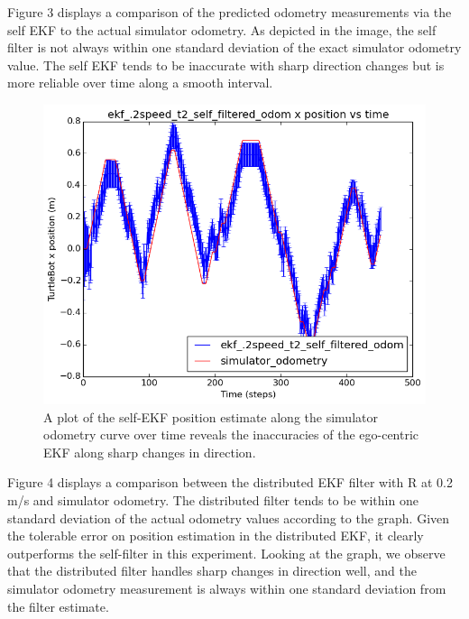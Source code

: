 \documentclass[conference]{IEEEtran} \usepackage[T1]{fontenc} \usepackage[backend=biber, style=ieee]{biblatex}
\begin{document}
Figure 3 displays a comparison of the predicted odometry measurements via the self EKF to the actual simulator 
odometry. As depicted in the image, the self filter is not always within one standard deviation of the exact simulator 
odometry value. The self EKF tends to be inaccurate with sharp direction changes but is more reliable over time along a smooth interval.

\begin{figure}[!ht]
\label{pic3} 
\centering 
\includegraphics[scale=.45]{ekf_2speed_t2_self_filtered_odom_pos_err_graph}
\caption {A plot of the self-EKF position estimate along the simulator odometry curve over time 
reveals the inaccuracies of the ego-centric EKF along sharp changes in direction.}
\end{figure}

\par
Figure 4 displays a comparison between the distributed EKF filter with R at 0.2 m/s and simulator odometry. The 
distributed filter tends to be within one standard deviation of the actual odometry values according to the graph. 
Given the tolerable error on position estimation in the distributed EKF, it clearly outperforms the self-filter 
in this experiment. Looking at the graph, we observe that the distributed filter handles sharp changes in direction well, and the simulator odometry measurement is always within one standard deviation from the filter estimate.
\end{document}

